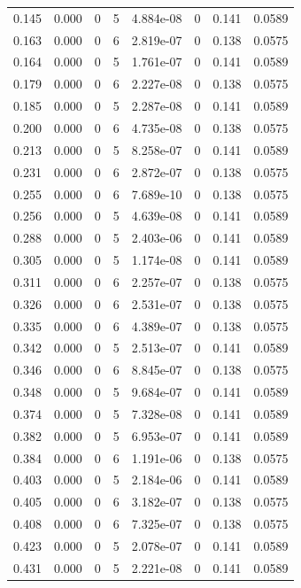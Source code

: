 \documentclass[preview]{standalone}
\begin{document}
{{\begin{tabular}{L{1.2cm}C{1.2cm} C{0.3cm}C{0.5cm} C{1.4cm}C{1.4cm} C{1.4cm}C{1.4cm}}
  0.145  &  0.000  & 0     &  5 &  4.884e-08  & 0  & 0.141 &  0.0589   \\ 
  0.163  &  0.000  & 0     &  6 &  2.819e-07  & 0  & 0.138 &  0.0575   \\ 
  0.164  &  0.000  & 0     &  5 &  1.761e-07  & 0  & 0.141 &  0.0589   \\ 
  0.179  &  0.000  & 0     &  6 &  2.227e-08  & 0  & 0.138 &  0.0575   \\ 
  0.185  &  0.000  & 0     &  5 &  2.287e-08  & 0  & 0.141 &  0.0589   \\ 
  0.200  &  0.000  & 0     &  6 &  4.735e-08  & 0  & 0.138 &  0.0575   \\ 
  0.213  &  0.000  & 0     &  5 &  8.258e-07  & 0  & 0.141 &  0.0589   \\ 
  0.231  &  0.000  & 0     &  6 &  2.872e-07  & 0  & 0.138 &  0.0575   \\ 
  0.255  &  0.000  & 0     &  6 &  7.689e-10  & 0  & 0.138 &  0.0575   \\ 
  0.256  &  0.000  & 0     &  5 &  4.639e-08  & 0  & 0.141 &  0.0589   \\ 
  0.288  &  0.000  & 0     &  5 &  2.403e-06  & 0  & 0.141 &  0.0589   \\ 
  0.305  &  0.000  & 0     &  5 &  1.174e-08  & 0  & 0.141 &  0.0589   \\ 
  0.311  &  0.000  & 0     &  6 &  2.257e-07  & 0  & 0.138 &  0.0575   \\ 
  0.326  &  0.000  & 0     &  6 &  2.531e-07  & 0  & 0.138 &  0.0575   \\ 
  0.335  &  0.000  & 0     &  6 &  4.389e-07  & 0  & 0.138 &  0.0575   \\ 
  0.342  &  0.000  & 0     &  5 &  2.513e-07  & 0  & 0.141 &  0.0589   \\ 
  0.346  &  0.000  & 0     &  6 &  8.845e-07  & 0  & 0.138 &  0.0575   \\ 
  0.348  &  0.000  & 0     &  5 &  9.684e-07  & 0  & 0.141 &  0.0589   \\ 
  0.374  &  0.000  & 0     &  5 &  7.328e-08  & 0  & 0.141 &  0.0589   \\ 
  0.382  &  0.000  & 0     &  5 &  6.953e-07  & 0  & 0.141 &  0.0589   \\ 
  0.384  &  0.000  & 0     &  6 &  1.191e-06  & 0  & 0.138 &  0.0575   \\ 
  0.403  &  0.000  & 0     &  5 &  2.184e-06  & 0  & 0.141 &  0.0589   \\ 
  0.405  &  0.000  & 0     &  6 &  3.182e-07  & 0  & 0.138 &  0.0575   \\ 
  0.408  &  0.000  & 0     &  6 &  7.325e-07  & 0  & 0.138 &  0.0575   \\ 
  0.423  &  0.000  & 0     &  5 &  2.078e-07  & 0  & 0.141 &  0.0589   \\ 
  0.431  &  0.000  & 0     &  5 &  2.221e-08  & 0  & 0.141 &  0.0589   \\ 
\hline 
\end{tabular} 

}}
\end{document}
